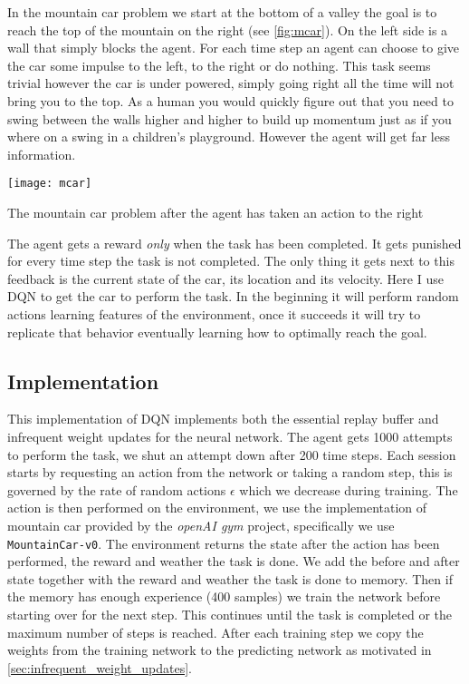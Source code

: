 \label{sec:mountain_car}
In the mountain car problem we start at the bottom of a valley the goal is to reach the top of the mountain on the right (see \autoref{fig:mcar}). On the left side is a wall that simply blocks the agent. For each time step an agent can choose to give the car some impulse to the left, to the right or do nothing. This task seems trivial however the car is under powered, simply going right all the time will not bring you to the top. As a human you would quickly figure out that you need to swing between the walls higher and higher to build up momentum just as if you where on a swing in a children's playground. However the agent will get far less information. 

\begin{marginfigure}
    \texttt{[image: mcar]}
    \caption{The mountain car problem after the agent has taken an action to the right}
    \label{fig:mcar}
\end{marginfigure}

The agent gets a reward \textit{only} when the task has been completed. It gets punished for every time step the task is not completed. The only thing it gets next to this feedback is the current state of the car, its location and its velocity. Here I use DQN to get the car to perform the task. In the beginning it will perform random actions learning features of the environment, once it succeeds it will try to replicate that behavior eventually learning how to optimally reach the goal.

\subsection{Implementation}
\label{sec:mcar_impl}
This implementation of DQN implements both the essential replay buffer and infrequent weight updates for the neural network. The agent gets 1000 attempts to perform the task, we shut an attempt down after 200 time steps. Each session starts by requesting an action from the network or taking a random step, this is governed by the rate of random actions $\epsilon$ which we decrease during training. The action is then performed on the environment, we use the implementation of mountain car provided by the \textit{openAI gym} project, specifically we use \texttt{MountainCar-v0}. The environment returns the state after the action has been performed, the reward and weather the task is done. We add the before and after state together with the reward and weather the task is done to memory. Then if the memory has enough experience (400 samples) we train the network before starting over for the next step. This continues until the task is completed or the maximum number of steps is reached. After each training step we copy the weights from the training network to the predicting network as motivated in \autoref{sec:infrequent_weight_updates}. 

